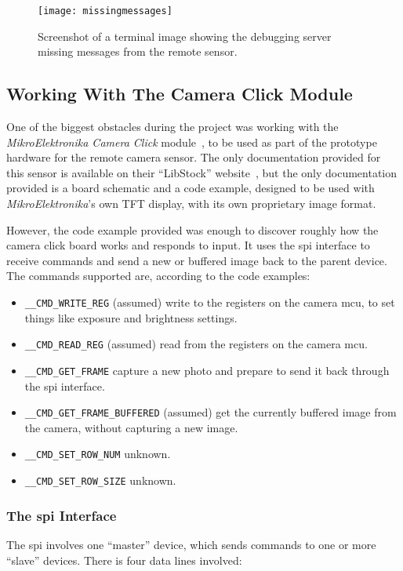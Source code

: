 \begin{figure}[h]
  \centering
  \texttt{[image: missingmessages]}
  \caption{Screenshot of a terminal image showing the debugging server
  missing messages from the remote sensor.}
  \label{fig:missingmessages}
\end{figure}

\subsection{Working With The Camera Click Module}
One of the biggest obstacles during the project was working with the
\textit{MikroElektronika Camera Click} module~\cite{cameraclick}, to be used
as part of the prototype hardware for the remote camera sensor. The only
documentation provided for this sensor is available on their ``LibStock''
website~\cite{cameraclickexamples}, but the only documentation provided is a
board schematic and a code example, designed to be used with
\textit{MikroElektronika}'s own TFT display, with its own proprietary image
format.

However, the code example provided was enough to discover roughly how the
camera click board works and responds to input. It uses the \acrshort{spi}
interface to receive commands and send a new or buffered image back to the
parent device. The commands supported are, according to the code examples:

\begin{itemize}
  \item \texttt{\_\_CMD\_WRITE\_REG} (assumed) write to the registers on the
  camera \acrfull{mcu}, to set things like exposure and brightness settings.
  \item \texttt{\_\_CMD\_READ\_REG} (assumed) read from the registers on the
  camera \acrshort{mcu}.
  \item \texttt{\_\_CMD\_GET\_FRAME} capture a new photo and prepare to send
  it back through the \acrshort{spi} interface.
  \item \texttt{\_\_CMD\_GET\_FRAME\_BUFFERED} (assumed) get the currently
  buffered image from the camera, without capturing a new image.
  \item \texttt{\_\_CMD\_SET\_ROW\_NUM} unknown.
  \item \texttt{\_\_CMD\_SET\_ROW\_SIZE} unknown.
\end{itemize}

\subsubsection{The \acrshort{spi} Interface}
The \acrshort{spi} involves one ``master'' device, which sends commands to
one or more ``slave'' devices. There is four data lines involved:

